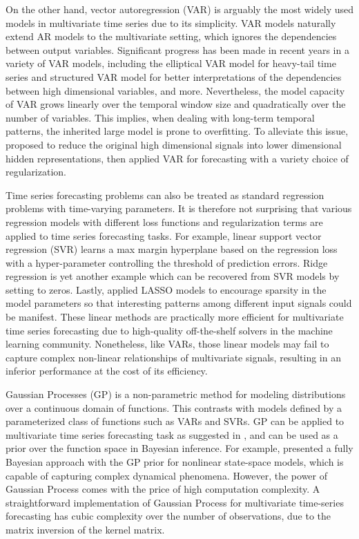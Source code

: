 \documentclass[sigconf]{acmart}
\begin{document}
On the other hand, vector autoregression (VAR) is arguably the most widely used models in multivariate time series \cite{hamilton1994time, box2015time, lutkepohl2005new} due to its simplicity. VAR models naturally extend AR models to the multivariate setting, which ignores the dependencies between output variables. Significant progress has been made in recent years in a variety of VAR models, including the elliptical VAR model \cite{qiu2015robust} for heavy-tail time series and structured VAR model \cite{melnyk2016estimating} for better interpretations of the dependencies between high dimensional variables, and more. Nevertheless, the model capacity of VAR grows linearly over the temporal window size and quadratically over the number of variables. This implies, when dealing with long-term temporal patterns, the inherited large model is prone to overfitting. To alleviate this issue, \cite{Yu_NIPS_16} proposed to reduce the original high dimensional signals into lower dimensional hidden representations, then applied VAR for forecasting with a variety choice of regularization.

Time series forecasting problems can also be treated as standard regression problems with time-varying parameters. It is therefore not surprising that various regression models with different loss functions and regularization terms are applied to time series forecasting tasks. For example, linear support vector regression (SVR) \cite{kim2003financial, cao2003support} learns a max margin hyperplane based on the regression loss with a hyper-parameter  controlling the threshold of prediction errors. Ridge regression is yet another example which can be recovered from SVR models by setting  to zeros. Lastly, \cite{li2014forecasting} applied LASSO models to encourage sparsity in the model parameters so that interesting patterns among different input signals could be manifest. These linear methods are practically more efficient for multivariate time series forecasting due to high-quality off-the-shelf solvers in the machine learning community. Nonetheless, like VARs, those linear models may fail to capture complex non-linear relationships of multivariate signals, resulting in an inferior performance at the cost of its efficiency.

Gaussian Processes (GP) is a non-parametric method for modeling distributions over a continuous domain of functions. This contrasts with models defined by a parameterized class of functions such as VARs and SVRs. GP can be applied to multivariate time series forecasting task as suggested in \cite{roberts2013gaussian}, and can be used as a prior over the function space in Bayesian inference. For example, \cite{frigola2013bayesian} presented a fully Bayesian approach with the GP prior for nonlinear state-space models, which is capable of capturing complex dynamical phenomena. However, the power of Gaussian Process comes with the price of high computation complexity. A straightforward implementation of Gaussian Process for multivariate time-series forecasting has cubic complexity over the number of observations, due to the matrix inversion of the kernel matrix.
\end{document}
